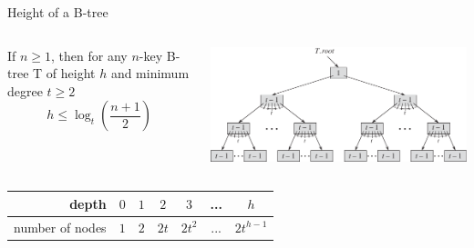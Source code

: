 \documentclass[11pt,t]{beamer}
\begin{document}
	\begin{frame}{Height of a B-tree}
		\begin{columns}[c]
			\begin{column}{.5\textwidth}
				\onslide<+->\begin{theorem}
					If \(n \geq 1\), then for any \(n\)-key B-tree T of height \(h\) and minimum degree \(t\geq 2\) \[h \leq \log_t\left(\frac{n+1}{2}\right)\]
				\end{theorem}
			\end{column}
			\begin{column}{.5\textwidth}
				\onslide<+->\includegraphics[width=\columnwidth]{images/height}
			\end{column}
		\end{columns}
		\centering
		\vspace{0.5cm}
		\renewcommand*{\arraystretch}{1.4}
		\onslide<+->\begin{tabular}{r | *{6}{|c}}
			depth & \(0\) & \(1\) & \(2\) & \(3\) & ... & \(h\)\\ \hline
			number of nodes & \(1\) & \(2\) & \(2t\) & \(2t^2\) & ... & \(2t^{h-1}\)
		\end{tabular}
	\end{frame}
\end{document}
